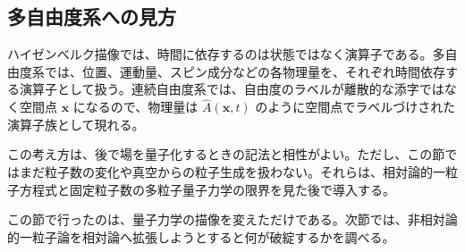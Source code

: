 \subsection{多自由度系への見方}
ハイゼンベルク描像では、時間に依存するのは状態ではなく演算子である。多自由度系では、位置、運動量、スピン成分などの各物理量を、それぞれ時間依存する演算子として扱う。連続自由度系では、自由度のラベルが離散的な添字ではなく空間点 $\mathbf{x}$ になるので、物理量は $\hat{A}(\mathbf{x},t)$ のように空間点でラベルづけされた演算子族として現れる。

この考え方は、後で場を量子化するときの記法と相性がよい。ただし、この節ではまだ粒子数の変化や真空からの粒子生成を扱わない。それらは、相対論的一粒子方程式と固定粒子数の多粒子量子力学の限界を見た後で導入する。

この節で行ったのは、量子力学の描像を変えただけである。次節では、非相対論的一粒子論を相対論へ拡張しようとすると何が破綻するかを調べる。
